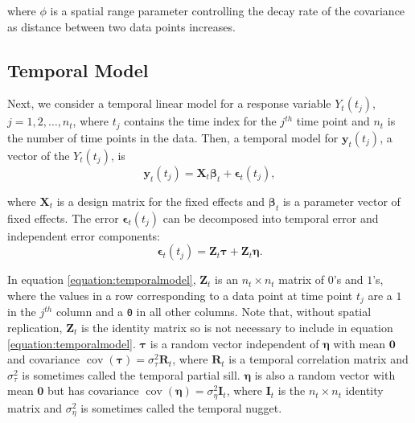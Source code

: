 \documentclass[]{interact}
\theoremstyle{plain}%
\theoremstyle{definition}
\theoremstyle{remark}
\begin{document}
\noindent where \(\phi\) is a spatial range parameter controlling the
decay rate of the covariance as distance between two data points
increases.

\subsection{Temporal Model} \label{subsection:temporalmodel}

Next, we consider a temporal linear model for a response variable
\(Y_t(t_j)\), \(j = 1, 2, \ldots, n_{t}\), where \(t_j\) contains the
time index for the \(j^{th}\) time point and \(n_t\) is the number of
time points in the data. Then, a temporal model for
\(\mathbf{y}_t(t_j)\), a vector of the \(Y_t(t_j)\), is \mbox{}
\begin{equation}
\mathbf{y}_t(t_j) = \mathbf{X}_t \bm{\beta}_t + \bm{\epsilon}_t(t_j),
\end{equation}

\noindent where \(\mathbf{X}_t\) is a design matrix for the fixed
effects and \(\bm{\beta}_t\) is a parameter vector of fixed effects. The
error \(\bm{\epsilon}_t(t_j)\) can be decomposed into temporal error and
independent error components: \mbox{} \begin{equation}
\label{equation:temporalmodel}
\bm{\epsilon}_t(t_j) = \mathbf{Z}_{t} \bm{\tau} + \mathbf{Z}_{t} \bm{\eta}.
\end{equation}

\noindent In equation \ref{equation:temporalmodel}, \(\mathbf{Z}_{t}\)
is an \(n_t \times n_t\) matrix of \(0\)'s and \(1\)'s, where the values
in a row corresponding to a data point at time point \(t_j\) are a \(1\)
in the \(j^{th}\) column and a \texttt{0} in all other columns. Note
that, without spatial replication, \(\mathbf{Z}_t\) is the identity
matrix so is not necessary to include in equation
\ref{equation:temporalmodel}. \(\bm{\tau}\) is a random vector
independent of \(\bm{\eta}\) with mean \(\mathbf{0}\) and covariance
\(\mathop{\mathrm{{cov}}}(\bm{\tau}) = \sigma^2_{\tau} \mathbf{R}_{t}\),
where \(\mathbf{R}_t\) is a temporal correlation matrix and
\(\sigma^2_{\tau}\) is sometimes called the temporal partial sill.
\(\bm{\eta}\) is also a random vector with mean \(\mathbf{0}\) but has
covariance
\(\mathop{\mathrm{{cov}}}(\bm{\eta}) = \sigma^2_{\eta} \mathbf{I}_{t}\),
where \(\mathbf{I}_t\) is the \(n_t \times n_t\) identity matrix and
\(\sigma^2_{\eta}\) is sometimes called the temporal nugget.
\end{document}
